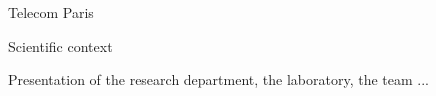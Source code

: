 \def\jobannouncement{JOB ANNOUNCEMENT}
\def\positiontitle{Position title}
\def\subtask{topic}
\def\positiontitleval{Postdoctoral fellow in Computer Science}
\def\department{DEPARTEMENT/Postdoc/2yrs}

%
%


\begin{redbox}{Telecom Paris}

\end{redbox}

\begin{redbox}{Scientific context}

Presentation of the research department, the laboratory, the team ...

\end{redbox}


